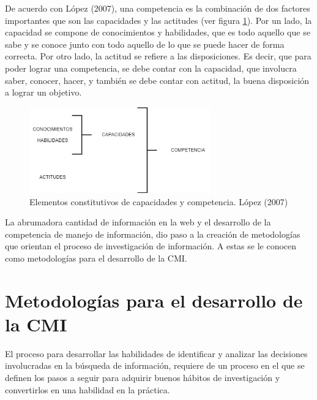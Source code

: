 De acuerdo con López (2007), una competencia es la combinación de dos factores importantes que son las capacidades y las actitudes (ver figura \ref{fig:21}). Por un lado, la capacidad se compone de conocimientos y habilidades, que es todo aquello que se sabe y se conoce junto con todo aquello de lo que se puede hacer de forma correcta. Por otro lado, la actitud se refiere a las disposiciones. Es decir, que para poder lograr una competencia, se debe contar con la capacidad, que involucra saber, conocer, hacer, y también se debe contar con actitud, la buena disposición a lograr un objetivo.

\begin{figure}[H]
  \centering
  \includegraphics[width=0.70\textwidth]{Cap2/Figuras/CMI.jpg}
  \caption{Elementos constitutivos de capacidades y competencia. López (2007)}
  \label{fig:21}
\end{figure}

La abrumadora cantidad de información en la web y el desarrollo de la competencia de manejo de información, dio paso a la creación de metodologías que orientan el proceso de investigación de información. A estas se le conocen como metodologías para el desarrollo de la CMI.


\section{Metodologías para el desarrollo de la CMI}
\label{secMetodologiasCap2}

El proceso para desarrollar las habilidades de identificar y analizar las decisiones involucradas en la búsqueda de información, requiere de un proceso en el que se definen los pasos a seguir para adquirir buenos hábitos de investigación y convertirlos en una habilidad en la práctica.

